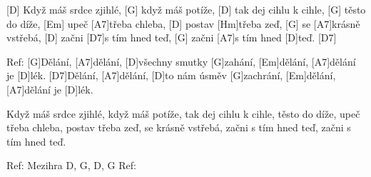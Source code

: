 
[D] Když máš srdce zjihlé, [G] když máš potíže, 
[D] tak dej cihlu k cihle, [G] těsto do díže, 
[Em] upeč [A7]třeba chleba, [D] postav [Hm]třeba zeď,
[G]  se [A7]krásně vstřebá, 
[D] začni [D7]s tím hned teď, 
[G] začni [A7]s tím hned [D]teď. [D7]


Ref: [G]Dělání, [A7]dělání, [D]všechny smutky [G]zahání, 
[Em]dělání, [A7]dělání je [D]lék. [D7]\null
[G]Dělání, [A7]dělání, [D]to nám úsměv [G]zachrání, 
[Em]dělání, [A7]dělání je [D]lék.

Když máš srdce zjihlé, když máš potíže, 
tak dej cihlu k cihle, těsto do díže, 
upeč třeba chleba, postav třeba zeď,
 se krásně vstřebá, začni s tím hned teď, 
začni s tím hned teď.

Ref: 
Mezihra D, G, D, G
Ref: 